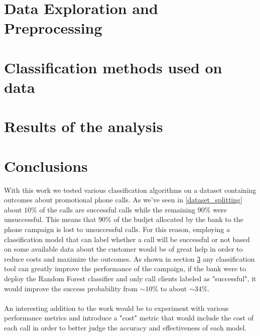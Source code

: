 \documentclass{article}
\numberwithin{equation}{section}
\theoremstyle{definition}
\theoremstyle{plain}
\theoremstyle{definition}
\theoremstyle{remark}
\begin{document}
\section{Data Exploration and Preprocessing}

\section{Classification methods used on data}
\label{classification_theory}

\section{Results of the analysis}
\label{results}


\section{Conclusions}
\label{concl}
With this work we tested various classification algorithms on a dataset containing outcomes about promotional phone calls. As we've seen in \ref{dataset_splitting} about \(10\%\) of the calls are successful calls while the remaining \(90\%\) were unsuccessful. This means that \(90\%\) of the budjet allocated by the bank to the phone campaign is lost to unsuccessful calls. For this reason, employing a classification model that can label whether a call will be successful or not based on some available data about the customer would be of great help in order to reduce costs and maximize the outcomes. As shown in section \ref{results} any classification tool can greatly improve the performance of the campaign, if the bank were to deploy the Random Forest classifier and only call clients labeled as "successful", it would improve the success probability from \(\sim 10\%\) to about \(\sim 34\%\).
\\
\\
An interesting addition to the work would be to experiment with various performance metrics and introduce a "cost" metric that would include the cost of each call in order to better judge the accuracy and effectiveness of each model.
\end{document}
